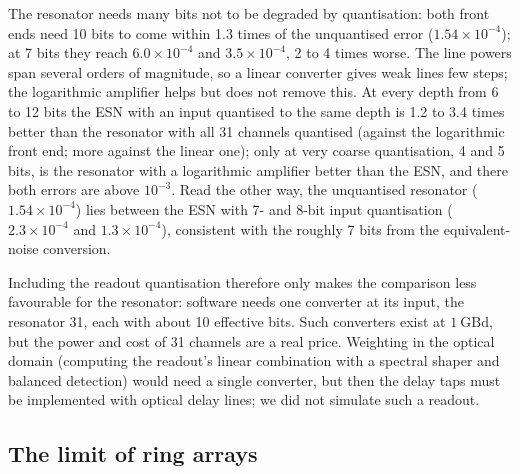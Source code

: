 

The resonator needs many bits not to be degraded by quantisation: both front ends need 10 bits to come within 1.3 times of the
unquantised error ($1.54\times10^{-4}$); at 7 bits they reach $6.0\times10^{-4}$ and $3.5\times10^{-4}$, 2 to 4 times worse. The
line powers span several orders of magnitude, so a linear converter gives weak lines few steps; the logarithmic amplifier helps but
does not remove this. At every depth from 6 to 12 bits the ESN with an input quantised to the same depth is 1.2 to 3.4 times better
than the resonator with all 31 channels quantised (against the logarithmic front end; more against the linear one); only at very
coarse quantisation, 4 and 5 bits, is the resonator with a logarithmic amplifier better than the ESN, and there both errors are above
$10^{-3}$. Read the other way, the unquantised resonator ($1.54\times10^{-4}$) lies between the ESN with 7- and 8-bit input
quantisation ($2.3\times10^{-4}$ and $1.3\times10^{-4}$), consistent with the roughly 7 bits from the equivalent-noise conversion.

Including the readout quantisation therefore only makes the comparison less favourable for the resonator: software needs one
converter at its input, the resonator 31, each with about 10 effective bits. Such converters exist at $1~\mathrm{GBd}$, but the power
and cost of 31 channels are a real price. Weighting in the optical domain (computing the readout's linear combination with a spectral
shaper and balanced detection) would need a single converter, but then the delay taps must be implemented with optical delay lines;
we did not simulate such a readout.

\subsection{The limit of ring arrays}

